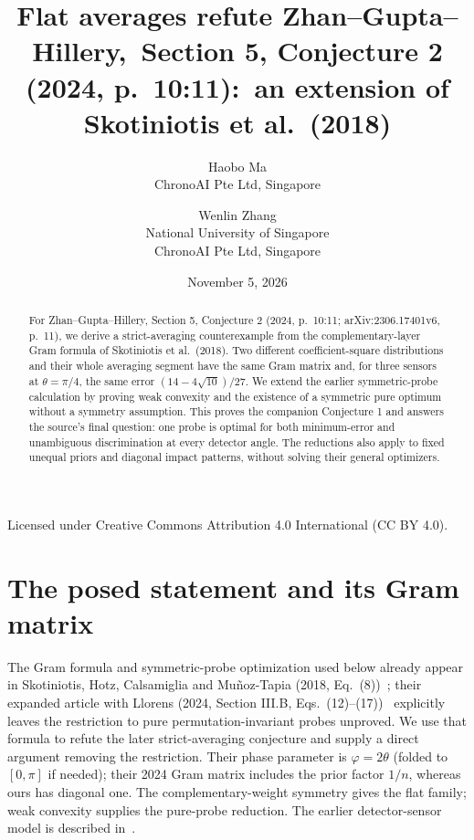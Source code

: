\documentclass[11pt]{article}
\title{Flat averages refute Zhan--Gupta--Hillery,\
Section 5, Conjecture 2 (2024, p.~10:11):\
an extension of Skotiniotis et al.\ (2018)}
\author{Haobo Ma\\\small ChronoAI Pte Ltd, Singapore
\and Wenlin Zhang\\\small National University of Singapore\\\small ChronoAI Pte Ltd, Singapore}
\date{November 5, 2026}
\begin{document}
\maketitle
\begin{abstract}
For Zhan--Gupta--Hillery, Section 5, Conjecture 2 (2024, p.~10:11;
arXiv:2306.17401v6, p.~11), we derive a strict-averaging counterexample
from the complementary-layer Gram formula of Skotiniotis et al.\ (2018).
Two different coefficient-square distributions and their whole averaging
segment have the same Gram matrix and, for three sensors at
$\theta=\pi/4$, the same error $(14-4\sqrt{10})/27$.
We extend the earlier symmetric-probe calculation by proving weak convexity
and the existence of a symmetric pure optimum without a symmetry assumption.
This proves the companion Conjecture 1 and answers the source's final question:
one probe is optimal for both minimum-error and unambiguous discrimination
at every detector angle. The reductions also apply to fixed unequal priors
and diagonal impact patterns, without solving their general optimizers.
\end{abstract}
\noindent\small Licensed under Creative Commons Attribution 4.0 International
(CC BY 4.0).\normalsize

\section{The posed statement and its Gram matrix}
The Gram formula and symmetric-probe optimization used below already appear
in Skotiniotis, Hotz, Calsamiglia and Mu\~noz-Tapia
(2018, Eq.~(8))~\cite{SHCM18}; their expanded article with Llorens
(2024, Section III.B, Eqs.~(12)--(17))~\cite{SLHCM24}
explicitly leaves the restriction to pure permutation-invariant probes
unproved. We use that formula to refute the later strict-averaging
conjecture and supply a direct argument removing the restriction.
Their phase parameter is $\varphi=2\theta$ (folded to $[0,\pi]$ if needed);
their 2024 Gram matrix includes the prior factor $1/n$, whereas ours
has diagonal one. The complementary-weight symmetry gives the flat family;
weak convexity supplies the pure-probe reduction. The earlier detector-sensor
model is described in~\cite{HGZ}.
\end{document}
